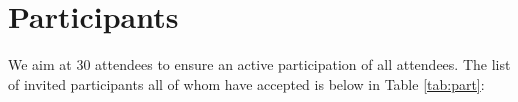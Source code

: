 \section{Participants}

We aim at 30 attendees to ensure an active participation of all
attendees. The list of invited participants all of whom have accepted is
below in Table \ref{tab:part}:





